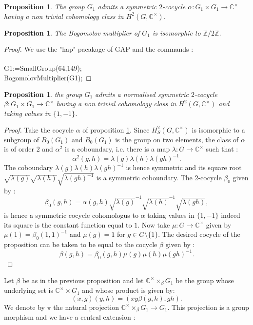\documentclass[12pt, reqno]{amsart}
\newtheorem{proposition}[theorem]{Proposition}
\begin{document}
\begin{proposition}\cite{MMb}\label{prop3}
The group $G_1$ admits a symmetric $2$-cocycle $\alpha :G_1\times G_1 \to \mathbb{C}^\times$ having a non trivial cohomology class in $H^2(G,\mathbb{C}^\times)$. 
\end{proposition}
\begin{proposition}
The Bogomolov multiplier of $G_1$ is isomorphic to $\mathbb{Z}/2\mathbb{Z}$.
\end{proposition}
\begin{proof}
We use the "hap" pacakage of GAP and the commands :\\\\ G1:=SmallGroup(64,149); \\BogomolovMultiplier(G1);
\end{proof}
\begin{proposition}
the group $G_1$ admits a normalised symmetric $2$-cocycle $\beta :G_1\times G_1 \to \mathbb{C}^\times$ having a non trivial cohomology class in $H^2(G,\mathbb{C}^\times)$ and taking values in $\{1,-1\}$.
\end{proposition}
\begin{proof}
Take the cocycle $\alpha$ of proposition \ref{prop3}. Since $H_S^2(G,\mathbb{C}^\times)$ is isomorphic to a subgroup of $B_0(G_1)$ and $B_0(G_1)$ is the group on two elements, the class of $\alpha$ is of order $2$ and $\alpha^2$ is a coboundary, i.e. there is a map $\lambda :G\to \mathbb{C}^\times$ such that :
$$\alpha^2(g,h)=\lambda(g)\lambda(h)\lambda(gh)^{-1}.$$
The coboundary $\lambda(g)\lambda(h)\lambda(gh)^{-1}$ is hence symmetric and its square root $\sqrt{\lambda(g)}\sqrt{\lambda(h)}\sqrt{\lambda(gh)^{-1}}$ is a symmetric coboundary. The $2$-cocycle $\beta_0$ given by :
$$\beta_0(g,h)=\alpha(g,h) \sqrt{\lambda(g)}^{-1}\sqrt{\lambda(h)}^{-1}\sqrt{\lambda(gh)},$$
is hence a symmetric cocycle cohomologus to $\alpha$ taking values in $\{1,-1\}$ indeed its square is the constant function equal to $1$. Now take $\mu:G \to \mathbb{C}^\times$ given by $\mu(1)=\beta_0(1,1)^{-1}$ and $\mu(g)=1$ for $g\in G\setminus \{1\}$. The desired cocycle of the proposition can be taken to be equal to the cocycle $\beta$ given by :
$$\beta(g,h)=\beta_0(g,h)\mu(g)\mu(h)\mu(gh)^{-1}.$$
\end{proof}
Let $\beta$ be as in the previous proposition and let $\mathbb{C}^\times \times_\beta G_1$ be the group whose underlying set is $\mathbb{C}^\times \times G_1$ and whose product is given by:
$$(x,g)(y,h)=(xy\beta(g,h),gh).$$
We denote by $\pi$ the natural projection $\mathbb{C}^\times \times_\beta G_1 \to G_1$. This projection is a group morphism and we have a central extension : 
\end{document}
